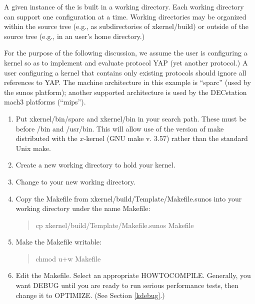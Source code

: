 A given instance of the \xk{} is built in a working directory.  Each
working directory can support one \xk{} configuration at a time.
Working directories may be organized within the \xk{} source tree
(e.g., as subdirectories of {\sanss xkernel/build}) or outside of
the source tree (e.g., in an \xk{} user's home directory.)  

For the purpose of the following discussion, we assume the user is
configuring a kernel so as to implement and evaluate protocol YAP 
(yet another protocol.) A
user configuring a kernel that contains only existing protocols should
ignore all references to YAP.  The machine architecture in this
example is ``sparc'' (used by the sunos platform); another supported 
architecture is used by the DECstation mach3 platforms (``mips'').

\begin{enumerate}

\item{}
Put {\sanss xkernel/bin/sparc} and {\sanss xkernel/bin} in
your search path. These must be before
{\sanss /bin} and {\sanss /usr/bin}. This will allow use of
the version of {\sanss make} distributed with the $x$-kernel (GNU make
v. 3.57) rather than the standard Unix {\sanss make}.

\item{}
Create a new working directory to hold your kernel.


\item{}
Change to your new working directory.

\item{}
Copy the Makefile
from {\sanss xkernel/build/Template/Makefile.sunos} into your
working directory under the name Makefile:

\begin{quote}
{\sanss cp xkernel/build/Template/Makefile.sunos Makefile}\\
\end{quote}

\item{}
Make the Makefile writable:
\begin{quote}
{\sanss chmod u+w Makefile}\\
\end{quote}

\item{}
Edit the Makefile.
Select an appropriate {\sanss HOWTOCOMPILE}. Generally, you want {\sanss
DEBUG} until you are ready to run serious performance tests, then
change it to {\sanss OPTIMIZE}. (See Section \ref{kdebug}.)


\end{enumerate}
